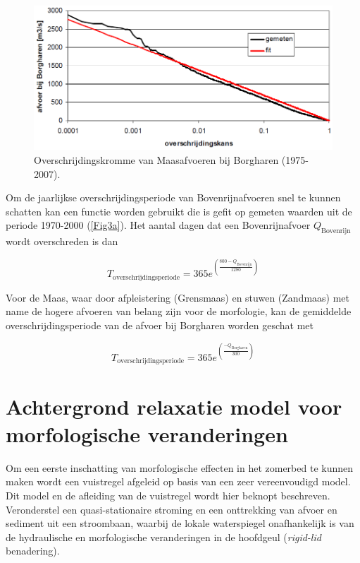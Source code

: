 \begin{figure}
\includegraphics[width=\columnwidth]{figures/Fig3b.png}
\caption{Overschrijdingskromme van Maasafvoeren bij Borgharen (1975-2007).}
\label{Fig3b}
\end{figure}

Om de jaarlijkse overschrijdingsperiode van Bovenrijnafvoeren snel te kunnen schatten kan een functie worden gebruikt die is gefit op gemeten waarden uit de periode 1970-2000 (\autoref{Fig3a}).
Het aantal dagen dat een Bovenrijnafvoer $Q_\text{Bovenrijn}$ wordt overschreden is dan

\begin{equation}
\label{Eq1a}
T_\text{overschrijdingsperiode} = 365 e^{\left ( \frac{800 -  Q_\text{Bovenrijn}}{1280} \right )}
\end{equation}

Voor de Maas, waar door afpleistering (Grensmaas) en stuwen (Zandmaas) met name de hogere afvoeren van belang zijn voor de morfologie, kan de gemiddelde overschrijdingsperiode van de afvoer bij Borgharen worden geschat met

\begin{equation}
\label{Eq1b}
T_\text{overschrijdingsperiode} = 365 e^{\left ( \frac{-  Q_\text{Borgharen}}{300} \right )}
\end{equation}

\section{Achtergrond relaxatie model voor morfologische veranderingen}

Om een eerste inschatting van morfologische effecten in het zomerbed te kunnen maken wordt een vuistregel afgeleid op basis van een zeer vereenvoudigd model.
Dit model en de afleiding van de vuistregel wordt hier beknopt beschreven.
Veronderstel een quasi-stationaire stroming en een onttrekking van afvoer en sediment uit een stroombaan, waarbij de lokale waterspiegel onafhankelijk is van de hydraulische en morfologische veranderingen in de hoofdgeul (\emph{rigid-lid} benadering).


